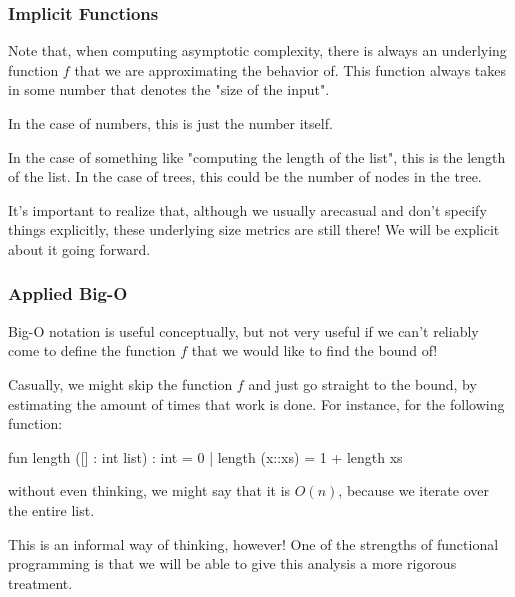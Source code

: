 \documentclass[aspectratio=169, handout]{beamer}
\begin{document}
\begin{frame}[fragile]
  \frametitle{Implicit Functions}

  Note that, when computing asymptotic complexity, there is always an underlying
  function $f$ that we are approximating the behavior of. This function always
  takes in some number that denotes the "size of the input".

  \vspace{\fill}

  In the case of numbers, this is just the number itself.

  \pause
  \vspace{\fill}

  In the case of something like "computing the length of the list", this is the
  length of the list. In the case of trees, this could be the number of nodes in
  the tree.

  \pause
  \vspace{\fill}

  It's important to realize that, although we usually arecasual and don't specify
  things explicitly, these underlying size metrics are still there! We will be
  explicit about it going forward.
\end{frame}


\begin{frame}[fragile]
  \frametitle{Applied Big-O}

  Big-O notation is useful conceptually, but not very useful if we can't reliably
  come to define the function $f$ that we would like to find the bound of!

  \pause
  \vspace{\fill}

  Casually, we might skip the function $f$ and just go straight to the bound, by
  estimating the amount of times that work is done. For instance, for the following
  function:

  \pause
  \vspace{5pt}

  \begin{codeblock}
    fun length ([] : int list) : int = 0
      | length (x::xs) = 1 + length xs
  \end{codeblock}

  \pause
  \vspace{5pt}

  without even thinking, we might say that it is $O(n)$, because we iterate over
  the entire list.

  \pause
  \vspace{\fill}

  This is an informal way of thinking, however! One of the strengths of functional
  programming is that we will be able to give this analysis a more rigorous
  treatment.
\end{frame}
\end{document}

